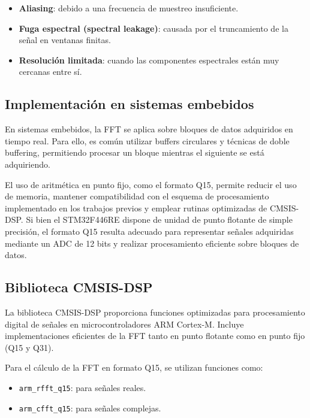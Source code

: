 \documentclass[12pt]{article}
\begin{document}
			\begin{itemize}
				\item \textbf{Aliasing}: debido a una frecuencia de muestreo insuficiente.
				\item \textbf{Fuga espectral (spectral leakage)}: causada por el truncamiento de la señal en ventanas finitas.
				\item \textbf{Resolución limitada}: cuando las componentes espectrales están muy cercanas entre sí.
			\end{itemize}

		\subsection{Implementación en sistemas embebidos}

			En sistemas embebidos, la FFT se aplica sobre bloques de datos adquiridos en tiempo real. Para ello, es común utilizar buffers circulares y técnicas de doble buffering, permitiendo procesar un bloque mientras el siguiente se está adquiriendo.

			El uso de aritmética en punto fijo, como el formato Q15, permite reducir el uso de memoria, mantener compatibilidad con el esquema de procesamiento implementado en los trabajos previos y emplear rutinas optimizadas de CMSIS-DSP. Si bien el STM32F446RE dispone de unidad de punto flotante de simple precisión, el formato Q15 resulta adecuado para representar señales adquiridas mediante un ADC de 12 bits y realizar procesamiento eficiente sobre bloques de datos.

		\subsection{Biblioteca CMSIS-DSP}

			La biblioteca CMSIS-DSP proporciona funciones optimizadas para procesamiento digital de señales en microcontroladores ARM Cortex-M. Incluye implementaciones eficientes de la FFT tanto en punto flotante como en punto fijo (Q15 y Q31).

			Para el cálculo de la FFT en formato Q15, se utilizan funciones como:

			\begin{itemize}
				\item \texttt{arm\_rfft\_q15}: para señales reales.
				\item \texttt{arm\_cfft\_q15}: para señales complejas.
			\end{itemize}
\end{document}
